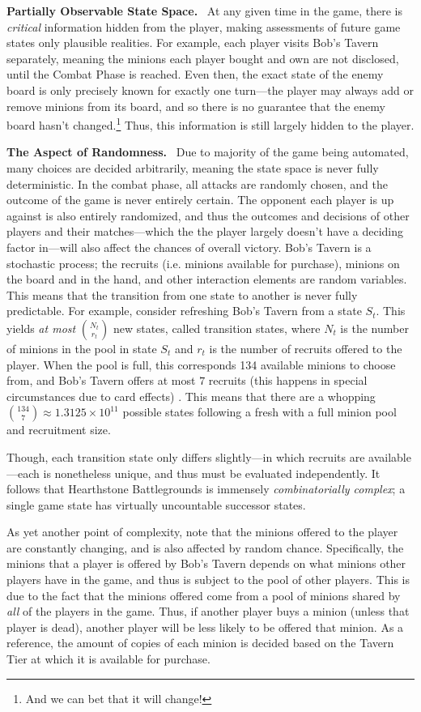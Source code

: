 \documentclass{paper}
\newcommand{\inlineSection}[1]{\vspace{0.5em}\noindent\textbf{#1.}~}
\begin{document}
\inlineSection{Partially Observable State Space} At any given time in the game, there is \textit{critical} information hidden from the player, making assessments of future game states only plausible realities. For example, each player visits Bob's Tavern separately, meaning the minions each player bought and own are not disclosed, until the Combat Phase is reached. Even then, the exact state of the enemy board is only precisely known for exactly one turn---the player may always add or remove minions from its board, and so there is no guarantee that the enemy board hasn't changed.\footnote{And we can bet that it will change!} Thus, this information is still largely hidden to the player. 

\inlineSection{The Aspect of Randomness} Due to majority of the game being automated, many choices are decided arbitrarily, meaning the state space is never fully deterministic. In the combat phase, all attacks are randomly chosen, and the outcome of the game is never entirely certain. The opponent each player is up against is also entirely randomized, and thus the outcomes and decisions of other players and their matches---which the the player largely doesn't have a deciding factor in---will also affect the chances of overall victory. Bob's Tavern is a stochastic process; the recruits (i.e. minions available for purchase), minions on the board and in the hand, and other interaction elements are random variables. This means that the transition from one state to another is never fully predictable. For example, consider refreshing Bob's Tavern from a state $S_t$. This yields \textit{at most} $N_t\choose r_t$ new states, called transition states, where $N_t$ is the number of minions in the pool in state $S_t$ and $r_t$ is the number of recruits offered to the player. When the pool is full, this corresponds 134 available minions to choose from, and Bob's Tavern offers at most $7$ recruits (this happens in special circumstances due to card effects) \cite{battlegrounds2019}. This means that there are a whopping ${{134}\choose{7}}\approx  1.3125\times 10^{11}$ possible states following a fresh with a full minion pool and recruitment size.

Though, each transition state only differs slightly---in which recruits are available---each is nonetheless unique, and thus must be evaluated independently. It follows that Hearthstone Battlegrounds is immensely \textit{combinatorially complex}; a single game state has virtually uncountable successor states.

As yet another point of complexity, note that the minions offered to the player are constantly changing, and is also affected by random chance. Specifically, the minions that a player is offered by Bob's Tavern depends on what minions other players have in the game, and thus is subject to the pool of other players. This is due to the fact that the minions offered come from a pool of minions shared by \textit{all} of the players in the game. Thus, if another player buys a minion (unless that player is dead), another player will be less likely to be offered that minion. As a reference, the amount of copies of each minion is decided based on the Tavern Tier at which it is available for purchase. 
\end{document}
